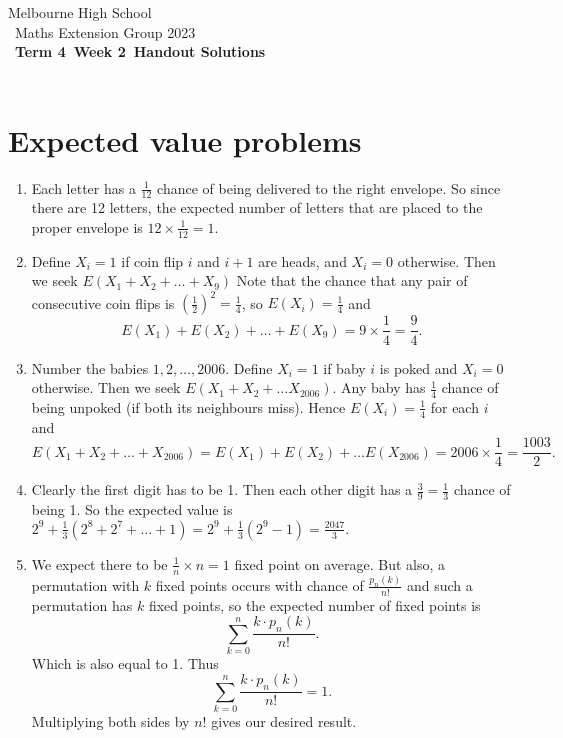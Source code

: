 \documentclass[a4paper]{article}
\title{{\thepdftitle}}
\author{Nathan Wong\and Tom Yan}
\date{2023}
\newcommand{\theterm}{4}
\newcommand{\theweek}{2}
\newcommand{\thedisplaytitle}{Term \theterm\ Week \theweek\ Handout Solutions}
\begin{document}
\noindent Melbourne High School\\\
\noindent Maths Extension Group 2023\\\
\noindent \textbf{\thedisplaytitle}\\\
\section*{Expected value problems}
\begin{enumerate}
\item Each letter has a $\frac{1}{12}$ chance of being delivered to the right envelope. So since there are 12 letters, the expected number of letters that are placed to the proper envelope is $12 \times \frac{1}{12}=1$. 
\item Define $X_i = 1$ if coin flip $i$ and $i+1$ are heads, and $X_i=0$ otherwise.  Then we seek $E(X_1 + X_2 +\ldots + X_9)$ Note that the chance that any pair of consecutive coin flips is $(\frac{1}{2})^2=\frac{1}{4}$, so $E(X_i)=\frac{1}{4}$ and $$E(X_1)+E(X_2)+\ldots+E(X_9)=9 \times \frac{1}{4}=\frac{9}{4}.$$
\item Number the babies $1,2, \ldots, 2006$. Define $X_i = 1$ if baby $i$ is poked and $X_i=0$ otherwise. Then we seek $E(X_1 + X_2 + \ldots X_{2006})$. Any baby has $\frac{1}{4}$ chance of being unpoked (if both its neighbours miss). Hence $E(X_i)=\frac{1}{4}$ for each $i$ and $$E(X_1 + X_2 + \ldots + X_{2006}) = E(X_1) + E(X_2) + \ldots E(X_{2006}) = 2006 \times \frac{1}{4} = \frac{1003}{2}. $$
\item Clearly the first digit has to be 1. Then each other digit has a $\frac{3}{9}=\frac{1}{3}$ chance of being 1. So the expected value is $2^9 + \frac{1}{3}(2^8+2^7+\ldots+1) = 2^9+\frac{1}{3}(2^9-1)=\frac{2047}{3}.$ 
\item We expect there to be $\frac{1}{n} \times n = 1$ fixed point on average. But also, a permutation with $k$ fixed points occurs with chance of $\frac{p_n (k)}{n!}$ and such a permutation has $k$ fixed points, so the expected number of fixed points is $$\sum_{k=0}^{n} \frac{k \cdot p_n (k)}{n!}.$$ Which is also equal to 1. Thus $$\sum_{k=0}^{n} \frac{k \cdot p_n (k)}{n!}=1.$$ Multiplying both sides by $n!$ gives our desired result. 
\end{enumerate}
\end{document}
